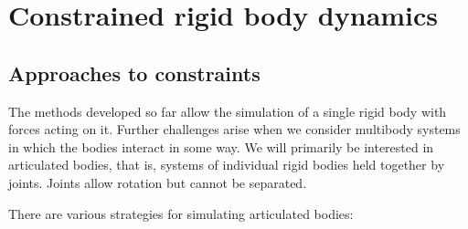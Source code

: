 \section{Constrained rigid body dynamics\label{constraints}}

\subsection{Approaches to constraints}
The methods developed so far allow the simulation of a single rigid body with forces
acting on it. Further challenges arise when we consider multibody systems in which the bodies
interact in some way. We will primarily be interested in articulated bodies, that is, systems
of individual rigid bodies held together by joints. Joints allow rotation but cannot be
separated.

There are various strategies for simulating articulated bodies:

